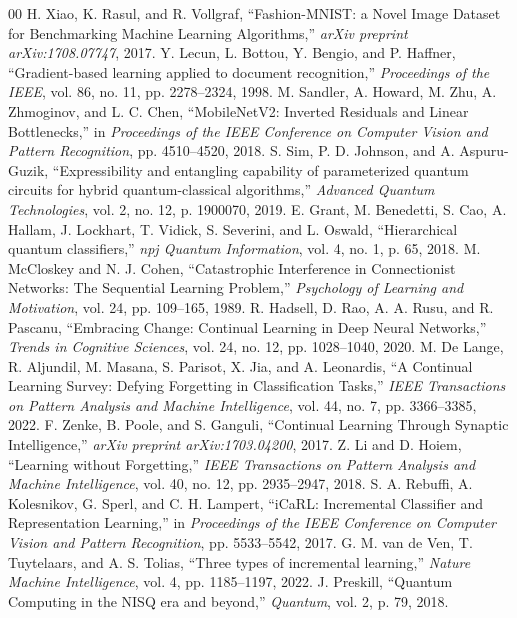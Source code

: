 \documentclass[conference]{IEEEtran}
\begin{document}
\begin{thebibliography}{00}
 H. Xiao, K. Rasul, and R. Vollgraf, ``Fashion-MNIST: a Novel Image Dataset for Benchmarking Machine Learning Algorithms,'' \emph{arXiv preprint arXiv:1708.07747}, 2017.
 Y. Lecun, L. Bottou, Y. Bengio, and P. Haffner, ``Gradient-based learning applied to document recognition,'' \emph{Proceedings of the IEEE}, vol. 86, no. 11, pp. 2278--2324, 1998.
 M. Sandler, A. Howard, M. Zhu, A. Zhmoginov, and L. C. Chen, ``MobileNetV2: Inverted Residuals and Linear Bottlenecks,'' in \emph{Proceedings of the IEEE Conference on Computer Vision and Pattern Recognition}, pp. 4510--4520, 2018.
 S. Sim, P. D. Johnson, and A. Aspuru-Guzik, ``Expressibility and entangling capability of parameterized quantum circuits for hybrid quantum-classical algorithms,'' \emph{Advanced Quantum Technologies}, vol. 2, no. 12, p. 1900070, 2019.
 E. Grant, M. Benedetti, S. Cao, A. Hallam, J. Lockhart, T. Vidick, S. Severini, and L. Oswald, ``Hierarchical quantum classifiers,'' \emph{npj Quantum Information}, vol. 4, no. 1, p. 65, 2018.
 M. McCloskey and N. J. Cohen, ``Catastrophic Interference in Connectionist Networks: The Sequential Learning Problem,'' \emph{Psychology of Learning and Motivation}, vol. 24, pp. 109--165, 1989.
 R. Hadsell, D. Rao, A. A. Rusu, and R. Pascanu, ``Embracing Change: Continual Learning in Deep Neural Networks,'' \emph{Trends in Cognitive Sciences}, vol. 24, no. 12, pp. 1028--1040, 2020.
 M. De Lange, R. Aljundil, M. Masana, S. Parisot, X. Jia, and A. Leonardis, ``A Continual Learning Survey: Defying Forgetting in Classification Tasks,'' \emph{IEEE Transactions on Pattern Analysis and Machine Intelligence}, vol. 44, no. 7, pp. 3366--3385, 2022.
 F. Zenke, B. Poole, and S. Ganguli, ``Continual Learning Through Synaptic Intelligence,'' \emph{arXiv preprint arXiv:1703.04200}, 2017.
 Z. Li and D. Hoiem, ``Learning without Forgetting,'' \emph{IEEE Transactions on Pattern Analysis and Machine Intelligence}, vol. 40, no. 12, pp. 2935--2947, 2018.
 S. A. Rebuffi, A. Kolesnikov, G. Sperl, and C. H. Lampert, ``iCaRL: Incremental Classifier and Representation Learning,'' in \emph{Proceedings of the IEEE Conference on Computer Vision and Pattern Recognition}, pp. 5533--5542, 2017.
 G. M. van de Ven, T. Tuytelaars, and A. S. Tolias, ``Three types of incremental learning,'' \emph{Nature Machine Intelligence}, vol. 4, pp. 1185--1197, 2022.
 J. Preskill, ``Quantum Computing in the NISQ era and beyond,'' \emph{Quantum}, vol. 2, p. 79, 2018.

\end{thebibliography}
\end{document}
